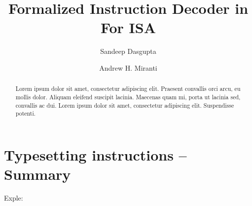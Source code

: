 \documentclass[a4paper,UKenglish,cleveref, autoref]{lipics-v2019}
\title{Formalized Instruction Decoder in \K For \ISA ISA} %
\author{Sandeep Dasgupta}{University of Illinois at Urbana Champaign, USA \and \url{http://sdasgup3.web.engr.illinois.edu} }{sdasgup3@illinois.edu}{}{}
\author{Andrew H. Miranti}{University of Illinois at Urbana Champaign, USA}{miranti2@illinois.edu}{}{}
\begin{document}
\maketitle

\begin{abstract}
Lorem ipsum dolor sit amet, consectetur adipiscing elit. Praesent convallis orci arcu, eu mollis dolor. Aliquam eleifend suscipit lacinia. Maecenas quam mi, porta ut lacinia sed, convallis ac dui. Lorem ipsum dolor sit amet, consectetur adipiscing elit. Suspendisse potenti. 
\end{abstract}

\section{Typesetting instructions -- Summary}
\label{sec:typesetting-summary}
Exple: ~\cite{DBLP:journals/cacm/Knuth74}





\end{document}
